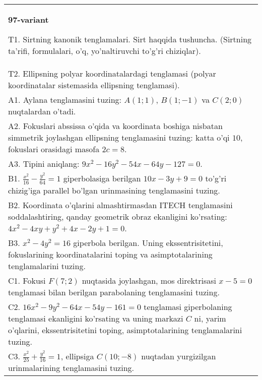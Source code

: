 \documentclass{article}
\begin{document}
\begin{tabular}{m{17cm}}
\textbf{97-variant}
\newline

T1. Sirtning kanonik tenglamalari. Sirt haqqida tushuncha. (Sirtning ta'rifi, formulalari, o'q, yo'naltiruvchi to'g'ri chiziqlar).\\

T2. Ellipsning polyar koordinatalardagi tenglamasi (polyar koordinatalar sistemasida ellipsning tenglamasi).\\

A1. Aylana tenglamasini tuzing: $A(1;1)$, $B(1;-1)$ va $C(2;0)$ nuqtalardan o'tadi.\\

A2. Fokuslari abssissa o'qida va koordinata boshiga nisbatan simmetrik joylashgan ellipsning tenglamasini tuzing: katta o'qi $10$, fokuslari orasidagi masofa $2c=8$.\\

A3. Tipini aniqlang: $9x^{2}-16y^{2}-54x-64y-127=0$.\\

B1. $\frac{x^{2}}{16} - \frac{y^{2}}{64} = 1$ giperbolasiga berilgan $10x - 3y + 9 = 0$ to'g'ri chizig'iga parallel bo'lgan urinmasining tenglamasini tuzing.  \\

B2. Koordinata o'qlarini almashtirmasdan ITECH tenglamasini soddalashtiring, qanday geometrik obraz ekanligini ko'rsating: $4x^{2} - 4xy + y^{2} + 4x - 2y + 1 = 0$.  \\

B3. $x^{2} - 4y^{2} = 16$ giperbola berilgan. Uning ekssentrisitetini, fokuslarining koordinatalarini toping va asimptotalarining tenglamalarini tuzing.\\

C1. Fokusi $F(7;2)$ nuqtasida joylashgan, mos direktrisasi $x - 5 = 0$ tenglamasi bilan berilgan parabolaning tenglamasini tuzing.  \\

C2. $16x^{2} - 9y^{2} - 64x - 54y - 161 = 0$ tenglamasi giperbolaning tenglamasi ekanligini ko'rsating va uning markazi $C$ ni, yarim o'qlarini, ekssentrisitetini toping, asimptotalarining tenglamalarini tuzing.  \\

C3. $\frac{x^{2}}{25} + \frac{y^{2}}{16} = 1$, ellipsiga $C(10; - 8)$ nuqtadan yurgizilgan urinmalarining tenglamasini tuzing.  \\

\end{tabular}
\vspace{1cm}
\end{document}
